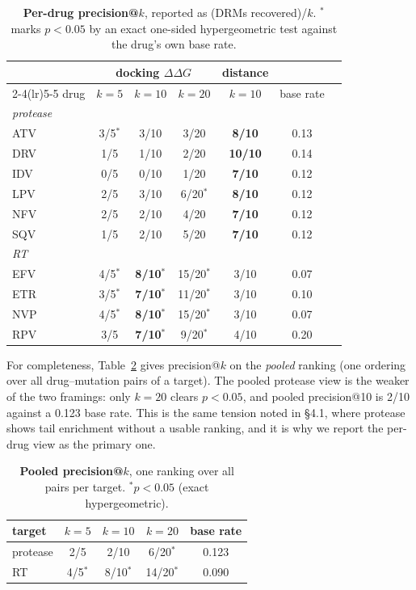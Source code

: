 \documentclass{article}
\newcommand{\ddg}{\ensuremath{\Delta\Delta G}}
\begin{document}
\begin{table}[h]
\centering
\caption{\textbf{Per-drug precision@$k$}, reported as (DRMs recovered)/$k$. ${}^{*}$ marks $p<0.05$ by an exact one-sided hypergeometric test against the drug's own base rate.}
\label{tab:patk}
\begin{tabular}{lcccccc}
\toprule
 & \multicolumn{3}{c}{docking \ddg{}} & \multicolumn{1}{c}{distance} & \\
\cmidrule(lr){2-4}\cmidrule(lr){5-5}
drug & $k=5$ & $k=10$ & $k=20$ & $k=10$ & base rate \\
\midrule
\multicolumn{6}{l}{\emph{protease}} \\
\quad ATV & 3/5$^{*}$ & 3/10 & 3/20 & \textbf{8/10} & 0.13 \\
\quad DRV & 1/5 & 1/10 & 2/20 & \textbf{10/10} & 0.14 \\
\quad IDV & 0/5 & 0/10 & 1/20 & \textbf{7/10} & 0.12 \\
\quad LPV & 2/5 & 3/10 & 6/20$^{*}$ & \textbf{8/10} & 0.12 \\
\quad NFV & 2/5 & 2/10 & 4/20 & \textbf{7/10} & 0.12 \\
\quad SQV & 1/5 & 2/10 & 5/20 & \textbf{7/10} & 0.12 \\
\midrule
\multicolumn{6}{l}{\emph{RT}} \\
\quad EFV & 4/5$^{*}$ & \textbf{8/10}$^{*}$ & 15/20$^{*}$ & 3/10 & 0.07 \\
\quad ETR & 3/5$^{*}$ & \textbf{7/10}$^{*}$ & 11/20$^{*}$ & 3/10 & 0.10 \\
\quad NVP & 4/5$^{*}$ & \textbf{8/10}$^{*}$ & 15/20$^{*}$ & 3/10 & 0.07 \\
\quad RPV & 3/5 & \textbf{7/10}$^{*}$ & 9/20$^{*}$ & 4/10 & 0.20 \\
\bottomrule
\end{tabular}
\end{table}

For completeness, Table~\ref{tab:pooledpatk} gives precision@$k$ on the
\emph{pooled} ranking (one ordering over all drug--mutation pairs of a target).
The pooled protease view is the weaker of the two framings: only $k=20$ clears
$p<0.05$, and pooled precision@10 is 2/10 against a 0.123 base rate. This is the
same tension noted in \S4.1, where protease shows tail enrichment without a usable
ranking, and it is why we report the per-drug view as the primary one.

\begin{table}[h]
\centering
\caption{\textbf{Pooled precision@$k$}, one ranking over all pairs per target. ${}^{*}p<0.05$ (exact hypergeometric).}
\label{tab:pooledpatk}
\begin{tabular}{lcccc}
\toprule
target & $k=5$ & $k=10$ & $k=20$ & base rate \\
\midrule
protease & 2/5 & 2/10 & 6/20$^{*}$ & 0.123 \\
RT & 4/5$^{*}$ & 8/10$^{*}$ & 14/20$^{*}$ & 0.090 \\
\bottomrule
\end{tabular}
\end{table}
\end{document}
